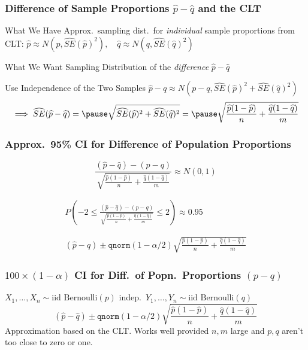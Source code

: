 \begin{frame}
\frametitle{Difference of Sample Proportions $\widehat{p}-\widehat{q}$ and the CLT}
\begin{block}{What We Have}
Approx.\ sampling dist.\ for \emph{individual} sample proportions from CLT:
\alert{$\widehat{p} \approx N\left(p, \widehat{SE}(\widehat{p})^2\right), \quad \widehat{q} \approx N\left(q, \widehat{SE}(\widehat{q})^2\right)$}
\end{block}\pause

\begin{block}{What We Want}
Sampling Distribution of the \emph{difference} $\widehat{p} - \widehat{q}$
\end{block}\pause

\begin{block}{Use Independence of the Two Samples}
\alert{$\widehat{p} - \widehat{q} \approx N\left( p - q, \widehat{SE}(\widehat{p})^2 +\widehat{SE}(\widehat{q})^2\right)$} \pause
$$\implies \widehat{SE}(\widehat{p} - \widehat{q}) = \pause \sqrt{\widehat{SE}(\widehat{p})^2 +\widehat{SE}(\widehat{q})^2}  = \pause  \sqrt{\frac{\widehat{p}(1-\widehat{p})}{n} + \frac{\widehat{q}(1-\widehat{q})}{m}}$$
\end{block}

\end{frame}
\begin{frame}
\frametitle{Approx.\ 95\% CI for Difference of Population Proportions}


$$\frac{(\widehat{p} - \widehat{q}) - (p - q)}{\sqrt{\frac{\widehat{p}(1-\widehat{p})}{n} + \frac{\widehat{q}(1-\widehat{q})}{m}}} \approx N(0,1)$$
 

 

\begin{eqnarray*}
	P\left( -2 \leq  \frac{(\widehat{p} - \widehat{q}) - (p - q)}{\sqrt{\frac{\widehat{p}(1-\widehat{p})}{n} + \frac{\widehat{q}(1-\widehat{q})}{m}}}\leq 2\right) \approx 0.95 \\ \\ \\ 
	(\widehat{p} - \widehat{q}) \pm \texttt{qnorm}(1-\alpha/2) \sqrt{\frac{\widehat{p}(1-\widehat{p})}{n} + \frac{\widehat{q}(1-\widehat{q})}{m}}
\end{eqnarray*}

\end{frame}
\begin{frame}
\frametitle{$100\times(1-\alpha)$ CI for Diff.\ of Popn.\ Proportions $(p-q)$}
$X_1, \hdots, X_n \sim \mbox{iid Bernoulli}(p)$ indep.\ $Y_1, \hdots, Y_n \sim \mbox{iid Bernoulli}(q)$
	$$(\widehat{p} - \widehat{q}) \pm \texttt{qnorm}(1-\alpha/2) \sqrt{\frac{\widehat{p}(1-\widehat{p})}{n} + \frac{\widehat{q}(1-\widehat{q})}{m}}$$
	\alert{Approximation based on the CLT. Works well provided $n,m$ large and $p,q$ aren't too close to zero or one.}
\end{frame}


